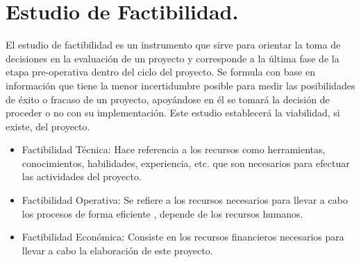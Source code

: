 \documentclass[12pt, a4paper, titlepage]{report}
\begin{document}
    	\section{Estudio de Factibilidad.}
    	El estudio de factibilidad es un instrumento que sirve para orientar la toma de decisiones en la evaluación de un proyecto y corresponde a la última fase de la etapa pre-operativa dentro del ciclo del proyecto. Se formula con base en información que tiene la menor incertidumbre posible para medir las posibilidades de éxito o fracaso de un proyecto, apoyándose en él se tomará la decisión de proceder o no con su implementación. Este estudio establecerá la viabilidad, si existe, del proyecto.
    	\begin{itemize}
    	    \item Factibilidad Técnica: Hace referencia a los recursos como herramientas, conocimientos, habilidades, experiencia, etc. que son necesarios para efectuar las actividades del proyecto.
    	    \item Factibilidad Operativa: Se refiere a los recursos necesarios para llevar a cabo los procesos de forma eficiente , depende de los recursos humanos.
    	    \item Factibilidad Econ\'omica: Consiste en los recursos financieros necesarios para llevar a cabo la elaboraci\'on de este proyecto.
    	\end{itemize}
\end{document}
